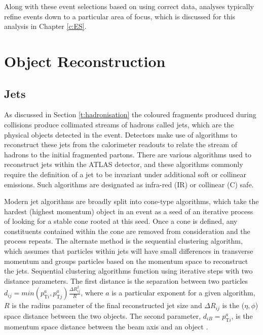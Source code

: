 	Along with these event selections based on using correct data, analyses typically refine events down to a particular area of focus, which is discussed for this analysis in Chapter \ref{c:ES}.

\section{Object Reconstruction}

	\subsection{Jets}

	As discussed in Section \ref{t:hadronisation} the coloured fragments produced during collisions produce collimated streams of hadrons called jets, which are the physical objects detected in the event. Detectors make use of algorithms to reconstruct these jets from the calorimeter readouts to relate the stream of hadrons to the initial fragmented partons. There are various algorithms used to reconstruct jets within the ATLAS detector, and these algorithms commonly require the definition of a jet to be invariant under additional soft or collinear emissions. Such algorithms are designated as infra-red (IR) or collinear (C) safe.

	Modern jet algorithms are broadly split into cone-type algorithms, which take the hardest (highest momentum) object in an event as a seed of an iterative process of looking for a stable cone rooted at this seed. Once a cone is defined, any constituents contained within the cone are removed from consideration and the process repeats. The alternate method is the sequential clustering algorithm, which assumes that particles within jets will have small differences in transverse momentum and groups particles based on the momentum space to reconstruct the jets. Sequential clustering algorithms function using iterative steps with two distance parameters. The first distance is the separation between two particles $d_{ij} = min(p_{\text{T}i}^a, p_{\text{T}j}^a)\frac{\Delta R_{ij}^2}{R}$, where $a$ is a particular exponent for a given algorithm, $R$ is the radius parameter of the final reconstructed jet size and $\Delta R_{ij}$ is the ($\eta, \phi$) space distance between the two objects. The second parameter, $d_{iB} = p_{\text{T}i}^a$, is the momentum space distance between the beam axis and an object \cite{jetreco}.

